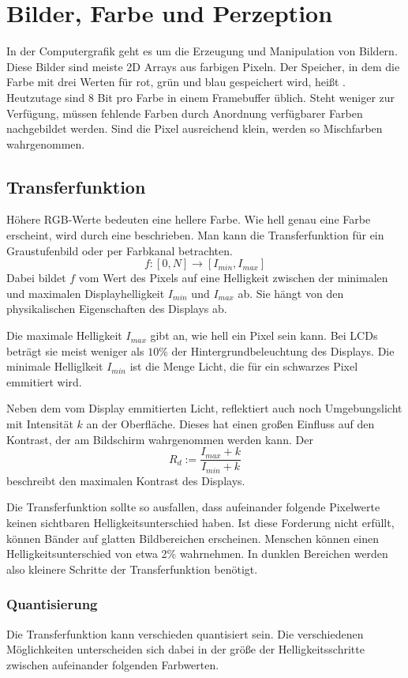 \chapter{Bilder, Farbe und Perzeption}
In der Computergrafik geht es um die Erzeugung und Manipulation von Bildern.
Diese Bilder sind meiste 2D Arrays aus farbigen Pixeln.
Der Speicher, in dem die Farbe mit drei Werten für rot, grün und blau gespeichert wird, heißt .
Heutzutage sind 8 Bit pro Farbe in einem Framebuffer üblich.
Steht weniger zur Verfügung, müssen fehlende Farben durch Anordnung verfügbarer Farben nachgebildet werden.
Sind die Pixel ausreichend klein, werden so Mischfarben wahrgenommen.

\section{Transferfunktion}
Höhere RGB-Werte bedeuten eine hellere Farbe.
Wie hell genau eine Farbe erscheint, wird durch eine  beschrieben.
Man kann die Transferfunktion für ein Graustufenbild oder per Farbkanal betrachten.
\[
	f : \left[0, N\right] \to \left[I_{min}, I_{max}\right]
\]
Dabei bildet $f$ vom Wert des Pixels auf eine Helligkeit zwischen der minimalen und maximalen Displayhelligkeit $I_{min}$ und $I_{max}$ ab.
Sie hängt von den physikalischen Eigenschaften des Displays ab.

Die maximale Helligkeit $I_{max}$ gibt an, wie hell ein Pixel sein kann.
Bei LCDs beträgt sie meist weniger als $10\%$ der Hintergrundbeleuchtung des Displays.
Die minimale Helliglkeit $I_{min}$ ist die Menge Licht, die für ein schwarzes Pixel emmitiert wird.

Neben dem vom Display emmitierten Licht, reflektiert auch noch Umgebungslicht mit Intensität $k$ an der Oberfläche.
Dieses hat einen großen Einfluss auf den Kontrast, der am Bildschirm wahrgenommen werden kann.
Der 
\[
	R_d := \frac{I_{max} + k}{I_{min} + k}
\]
beschreibt den maximalen Kontrast des Displays.

Die Transferfunktion sollte so ausfallen, dass aufeinander folgende Pixelwerte keinen sichtbaren Helligkeitsunterschied haben.
Ist diese Forderung nicht erfüllt, können Bänder auf glatten Bildbereichen erscheinen.
Menschen können einen Helligkeitsunterschied von etwa 2\% wahrnehmen.
In dunklen Bereichen werden also kleinere Schritte der Transferfunktion benötigt.

\subsection{Quantisierung}
Die Transferfunktion kann verschieden quantisiert sein.
Die verschiedenen Möglichkeiten unterscheiden sich dabei in der größe der Helligkeitsschritte zwischen aufeinander folgenden Farbwerten.


